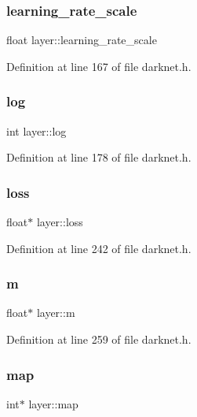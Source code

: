 \subsubsection{\texorpdfstring{learning\_rate\_scale}{learning\_rate\_scale}}
{\footnotesize\ttfamily float layer\+::learning\+\_\+rate\+\_\+scale}



Definition at line 167 of file darknet.\+h.

\mbox{\label{structlayer_a540b5bcf6b30bef535ff82e133bffd79}} 
\subsubsection{\texorpdfstring{log}{log}}
{\footnotesize\ttfamily int layer\+::log}



Definition at line 178 of file darknet.\+h.

\mbox{\label{structlayer_a6554389eac1170d557224124d81eb3d6}} 
\subsubsection{\texorpdfstring{loss}{loss}}
{\footnotesize\ttfamily float$\ast$ layer\+::loss}



Definition at line 242 of file darknet.\+h.

\mbox{\label{structlayer_acfd875ae4a4c774d30e04e03a24085f9}} 
\subsubsection{\texorpdfstring{m}{m}}
{\footnotesize\ttfamily float$\ast$ layer\+::m}



Definition at line 259 of file darknet.\+h.

\mbox{\label{structlayer_a9950b1b44120256269e082cb5efbd42e}} 
\subsubsection{\texorpdfstring{map}{map}}
{\footnotesize\ttfamily int$\ast$ layer\+::map}



